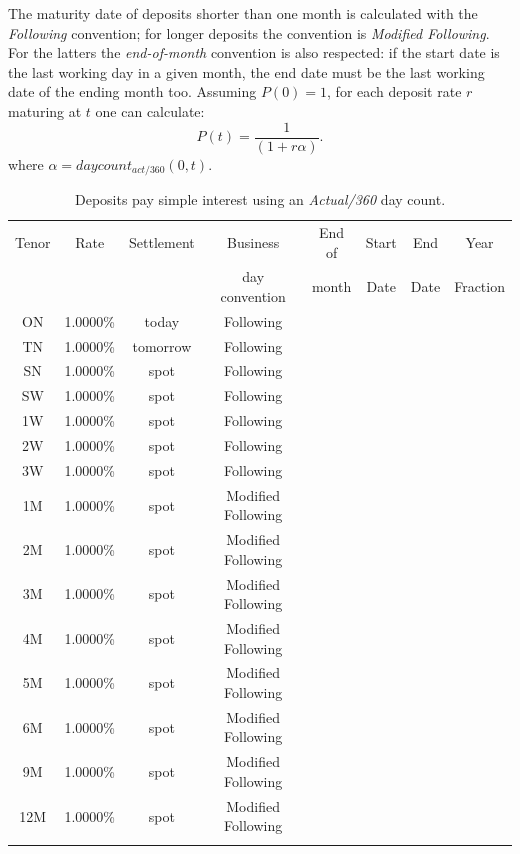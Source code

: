 \documentclass[11pt,reqno]{amsart}
\begin{document}
The maturity date of deposits shorter than one month is calculated with the {\it Following} convention; for longer deposits the convention is {\it Modified Following}. For the latters the {\it end-of-month} convention is also respected: if the start date is the last working day in a given month, the end date must be the last working date of the ending month too.
Assuming $P(0)=1$, for each deposit rate $r$ maturing at $t$ one can calculate:
\begin{equation}
P(t) = \frac{1}{(1 + r \alpha)}.
\label{eqn:deposit}
\end{equation}
where $\alpha = daycount_{act/360}(0,t)$.
\begin{table}[tbp]
\label{tab:deposits}
\begin{tabular}{cccccccc}
Tenor & Rate & Settlement & Business       & End of & Start & End  & Year \\
      &      &            & day convention & month   & Date  & Date & Fraction \\
ON & 1.0000\% & today & Following &  &  \\
TN & 1.0000\% & tomorrow & Following &  &  \\
SN & 1.0000\% & spot & Following &  &  \\
SW & 1.0000\% & spot & Following &  &  \\
1W & 1.0000\% & spot & Following &  &  \\
2W & 1.0000\% & spot & Following &  &  \\
3W & 1.0000\% & spot & Following &  &  \\
1M & 1.0000\% & spot & Modified Following &  &  \\
2M & 1.0000\% & spot & Modified Following &  &  \\
3M & 1.0000\% & spot & Modified Following &  &  \\
4M & 1.0000\% & spot & Modified Following &  &  \\
5M & 1.0000\% & spot & Modified Following &  &  \\
6M & 1.0000\% & spot & Modified Following &  &  \\
9M & 1.0000\% & spot & Modified Following &  &  \\
12M & 1.0000\% & spot & Modified Following &  &  \\
&  &  &  &  &
\end{tabular}%
\caption{Deposits pay simple interest using an \emph{Actual/360} day count.}
\end{table}
\end{document}
